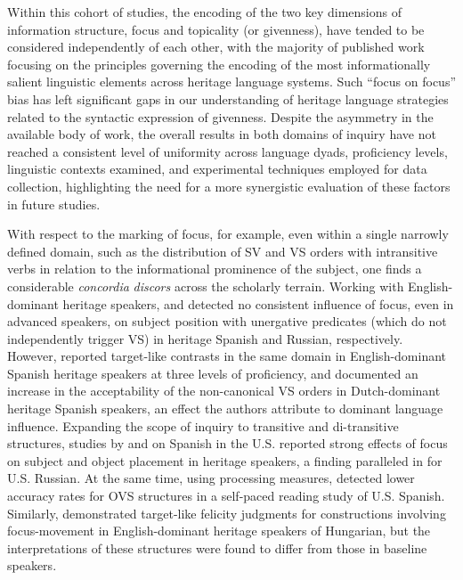 \documentclass[output=paper]{langscibook}
\begin{document}
Within this cohort of studies, the encoding of the two key dimensions of information structure, focus and topicality (or givenness), have tended to be considered independently of each other, with the majority of published work focusing on the principles governing the encoding of the most informationally salient linguistic elements across heritage language systems. Such “focus on focus” bias has left significant gaps in our understanding of heritage language strategies related to the syntactic expression of givenness. Despite the asymmetry in the available body of work, the overall results in both domains of inquiry have not reached a consistent level of uniformity across language dyads, proficiency levels, linguistic contexts examined, and experimental techniques employed for data collection, highlighting the need for a more synergistic evaluation of these factors in future studies.

With respect to the marking of focus, for example, even within a single narrowly defined domain, such as the distribution of SV and VS orders with intransitive verbs in relation to the informational prominence of the subject, one finds a considerable \textit{concordia} \textit{discors} across the scholarly terrain. Working with English-dominant heritage speakers, \citet{ZapataToribio2005} and \citet{Laleko2022} detected no consistent influence of focus, even in advanced speakers, on subject position with unergative predicates (which do not independently trigger VS) in heritage Spanish and Russian, respectively. However, \citet{PradaPérezCabo2012} reported target-like contrasts in the same domain in English-dominant Spanish heritage speakers at three levels of proficiency, and \citet{vanOschSleeman2018Subject} documented an increase in the acceptability of the non-canonical VS orders in Dutch-dominant heritage Spanish speakers, an effect the authors attribute to dominant language influence. Expanding the scope of inquiry to transitive and di-transitive structures, studies by \citet{Hoot2017} and  \citet{GómezSolerCabo2018} on Spanish in the U.S. reported strong effects of focus on subject and object placement in heritage speakers, a finding paralleled in \citet{IoninStyrina2021} for U.S. Russian. At the same time, using processing measures, \citet{SagarraSanchezBel2019} detected lower accuracy rates for OVS structures in a self-paced reading study of U.S. Spanish. Similarly, \citet{Hoot2019} demonstrated target-like felicity judgments for constructions involving focus-movement in English-dominant heritage speakers of Hungarian, but the interpretations of these structures were found to differ from those in baseline speakers.
\end{document}
